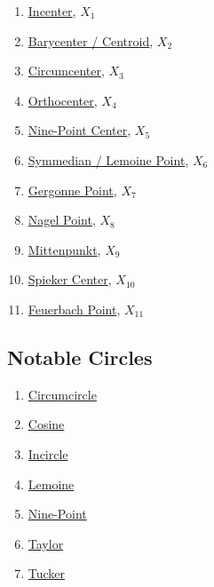 \documentclass[]{article}
\providecommand{\tightlist}{%
  \setlength{\itemsep}{0pt}\setlength{\parskip}{0pt}}
\begin{document}
\begin{enumerate}
\def\labelenumi{\arabic{enumi}.}
\tightlist
\item
  \href{http://mathworld.wolfram.com/incenter.html}{Incenter}, \(X_1\)
\item
  \href{http://mathworld.wolfram.com/TriangleCentroid.html}{Barycenter / Centroid}, \(X_2\)
\item
  \href{http://mathworld.wolfram.com/Circumcenter.html}{Circumcenter}, \(X_3\)
\item
  \href{http://mathworld.wolfram.com/Orthocenter.html}{Orthocenter}, \(X_4\)
\item
  \href{http://mathworld.wolfram.com/Nine-PointCenter.html}{Nine-Point Center}, \(X_5\)
\item
  \href{http://mathworld.wolfram.com/SymmedianPoint.html}{Symmedian / Lemoine Point}, \(X_6\)
\item
  \href{http://mathworld.wolfram.com/SymmedianPoint.html}{Gergonne Point}, \(X_7\)
\item
  \href{http://mathworld.wolfram.com/NagelPoint.html}{Nagel Point}, \(X_8\)
\item
  \href{http://mathworld.wolfram.com/Mittenpunkt.html}{Mittenpunkt}, \(X_9\)
\item
  \href{http://mathworld.wolfram.com/Mittenpunkt.html}{Spieker Center}, \(X_{10}\)
\item
  \href{http://mathworld.wolfram.com/FeuerbachPoint.html}{Feuerbach Point}, \(X_{11}\)
\end{enumerate}

\hypertarget{notable-circles}{%
\subsection{Notable Circles}\label{notable-circles}}

\begin{enumerate}
\def\labelenumi{\arabic{enumi}.}
\tightlist
\item
  \href{http://mathworld.wolfram.com/Circumcircle.html}{Circumcircle}
\item
  \href{http://mathworld.wolfram.com/CosineCircle.html}{Cosine}
\item
  \href{http://mathworld.wolfram.com/Incircle.html}{Incircle}
\item
  \href{http://mathworld.wolfram.com/FirstLemoineCircle.html}{Lemoine}
\item
  \href{http://mathworld.wolfram.com/Nine-PointCircle.html}{Nine-Point}
\item
  \href{http://mathworld.wolfram.com/TaylorCircle.html}{Taylor}
\item
  \href{http://mathworld.wolfram.com/TuckerCircles.html}{Tucker}
\end{enumerate}
\end{document}
